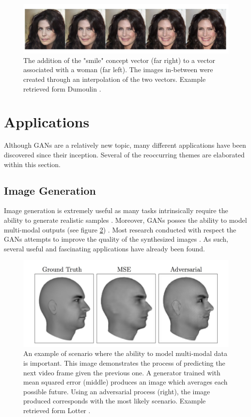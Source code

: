 \documentclass[11pt]{article}
\begin{document}
\begin{figure}
\centering
\includegraphics[scale=0.45]{smile_concept_vector}
\caption{The addition of the "smile" concept vector (far right) to a vector associated with a woman (far left). The images in-between were created through an interpolation of the two vectors. Example retrieved form Dumoulin  \citep{2016arXiv160600704D}.}
\label{fig:conceptvector}
\end{figure}



\section{Applications} \label{sec:applications}
Although GANs are a relatively new topic, many different applications have been discovered since their inception. Several of the reoccurring themes are elaborated within this section.

\subsection{Image Generation} \label{sec:img2img}
Image generation is extremely useful as many tasks intrinsically require the ability to generate realistic samples \citep{2017arXiv170100160G}. Moreover, GANs posses the ability to model multi-modal outputs (see figure \ref{fig:multimodal}) \citep{2017arXiv170100160G}. Most research conducted with respect the GANs attempts to improve the quality of the synthesized images \citep{2017arXiv171007035C}. As such, several useful and fascinating applications have already been found.

\begin{figure}
\centering
\includegraphics[scale=0.7]{multimodal}
\caption{An example of scenario where the ability to model multi-modal data is important. This image demonstrates the process of predicting the next video frame given the previous one. A generator trained with mean squared error (middle) produces an image which averages each possible future. Using an adversarial process (right), the image produced corresponds with the most likely scenario. Example retrieved form Lotter  \citep{2015arXiv151106380L}.}
\label{fig:multimodal}
\end{figure}
\end{document}

